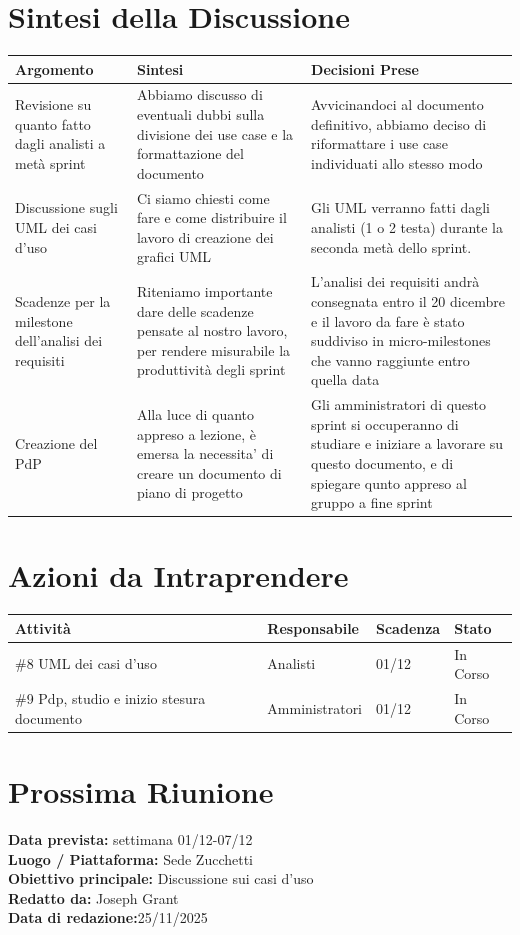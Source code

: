 \documentclass[a4paper,12pt]{article}
\begin{document}
\section*{ Sintesi della Discussione}

\begin{longtable}{|p{}|p{}|p{}|}
\hline
\textbf{Argomento} & \textbf{Sintesi} & \textbf{Decisioni Prese} \\ \hline
 Revisione su quanto fatto dagli analisti a metà sprint&Abbiamo discusso di eventuali dubbi sulla divisione dei use case e la formattazione del documento&Avvicinandoci al documento definitivo, abbiamo deciso di riformattare i use case individuati allo stesso modo   \\ \hline

 Discussione sugli UML dei casi d'uso&Ci siamo chiesti come fare e come distribuire il lavoro di creazione dei grafici UML&Gli UML verranno fatti dagli analisti (1 o 2  testa) durante la seconda metà dello sprint.   \\ \hline

Scadenze per la milestone dell'analisi dei requisiti&Riteniamo importante dare delle scadenze pensate al nostro lavoro, per rendere misurabile la produttività degli sprint&L'analisi dei requisiti andrà consegnata entro il 20 dicembre e il lavoro da fare è stato suddiviso in micro-milestones che vanno raggiunte entro quella data \\ \hline

Creazione del PdP&Alla luce di quanto appreso a lezione, è emersa la necessita' di creare un documento di piano di progetto&Gli amministratori di questo sprint si occuperanno di studiare e iniziare a lavorare su questo documento, e di spiegare qunto appreso al gruppo a fine sprint \\ \hline


 
 
\end{longtable}


\section*{ Azioni da Intraprendere}

\begin{longtable}{|p{}|p{}|p{}|p{}|}
\hline
\textbf{Attività} & \textbf{Responsabile} & \textbf{Scadenza} & \textbf{Stato} \\ \hline
\#8 UML dei casi d'uso&Analisti  &01/12  &In Corso  \\ \hline
\#9 Pdp, studio e inizio stesura documento &Amministratori  &01/12  &In Corso  \\ \hline
\end{longtable}


\section*{ Prossima Riunione}
\textbf{Data prevista:} settimana 01/12-07/12  \\
\textbf{Luogo / Piattaforma:} Sede Zucchetti \\
\textbf{Obiettivo principale:} Discussione sui casi d'uso\\


\textbf{Redatto da:} Joseph Grant \\
\textbf{Data di redazione:}25/11/2025
\end{document}
